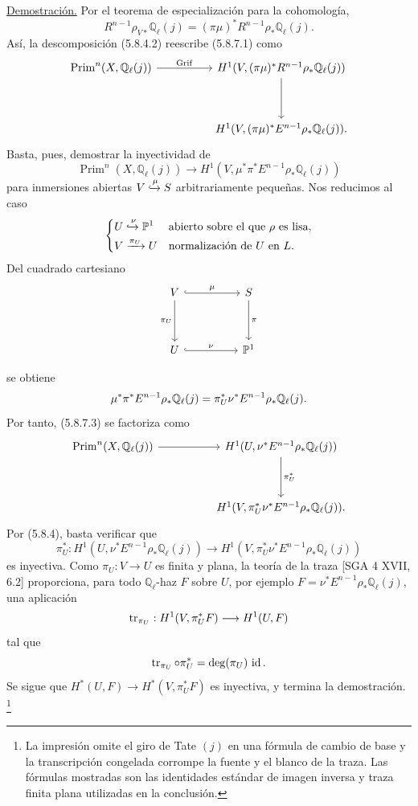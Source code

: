 \noindent\underline{Demostración.}
Por el teorema de especialización para la cohomología,
\[
R^{n-1}\rho_{V*}\mathbb Q_\ell(j)
=(\pi\mu)^*R^{n-1}\rho_*\mathbb Q_\ell(j).
\]
Así, la descomposición (5.8.4.2) reescribe (5.8.7.1) como
\[
\begin{tikzcd}[column sep=huge,row sep=huge]
\operatorname{Prim}^n(X,\mathbb Q_\ell(j))
  \arrow[r,"\operatorname{Grif}"]
& H^1(V,(\pi\mu)^*R^{n-1}\rho_*\mathbb Q_\ell(j)) \arrow[d] \\
{}
& H^1(V,(\pi\mu)^*E^{n-1}\rho_*\mathbb Q_\ell(j)).
\end{tikzcd}
\]
Basta, pues, demostrar la inyectividad de
\begin{equation}\tag{5.8.7.3}
\operatorname{Prim}^n(X,\mathbb Q_\ell(j))
\longrightarrow
H^1(V,\mu^*\pi^*E^{n-1}\rho_*\mathbb Q_\ell(j))
\end{equation}
para inmersiones abiertas $V\xhookrightarrow{\mu}S$ arbitrariamente
pequeñas. Nos reducimos al caso
\[
\left\{
\begin{aligned}
U&\xhookrightarrow{\nu}\mathbb P^1
   &&\text{abierto sobre el que $\rho$ es lisa},\\
V&\xrightarrow{\pi_U}U
   &&\text{normalización de $U$ en $L$}.
\end{aligned}
\right.
\]
Del cuadrado cartesiano
\[
\begin{tikzcd}[column sep=huge,row sep=huge]
V\arrow[r,hook,"\mu"]\arrow[d,"\pi_U"']
&S\arrow[d,"\pi"]\\
U\arrow[r,hook,"\nu"]
&\mathbb P^1
\end{tikzcd}
\]

\pageoriginale

se obtiene
\[
\mu^*\pi^*E^{n-1}\rho_*\mathbb Q_\ell(j)
=\pi_U^*\nu^*E^{n-1}\rho_*\mathbb Q_\ell\sisi{}{(j)}.
\]
Por tanto, (5.8.7.3) se factoriza como
\[
\begin{tikzcd}[column sep=huge,row sep=huge]
\operatorname{Prim}^n(X,\mathbb Q_\ell(j)) \arrow[r]
&H^1(U,\nu^*E^{n-1}\rho_*\mathbb Q_\ell(j))
  \arrow[d,"\pi_U^*"] \\
{}
&H^1(V,\pi_U^*\nu^*E^{n-1}\rho_*\mathbb Q_\ell(j)).
\end{tikzcd}
\]
Por (5.8.4), basta verificar que
\[
\pi_U^*:H^1(U,\nu^*E^{n-1}\rho_*\mathbb Q_\ell(j))
\longrightarrow
H^1(V,\pi_U^*\nu^*E^{n-1}\rho_*\mathbb Q_\ell(j))
\]
es inyectiva. Como $\pi_U:V\to U$ es finita y plana, la teoría de la
traza [SGA 4 XVII, 6.2] proporciona, para todo $\mathbb Q_\ell$-haz
$F$ sobre $U$, por ejemplo
$F=\nu^*E^{n-1}\rho_*\mathbb Q_\ell(j)$, una aplicación
\[
\operatorname{tr}_{\pi_U}:H^1(V,\pi_U^*\sisi{}{F})
\longrightarrow H^1(U,F\sisi{(j)}{})
\]
tal que
\[
\sisi{\operatorname{tr}_{\pi}\circ\pi^*}
{\operatorname{tr}_{\pi_U}\circ\pi_U^*}
=\deg(\pi_U)\,\operatorname{id}.
\]
Se sigue que $H^*(U,F)\to H^*(V,\pi_U^*F)$ es inyectiva, y termina la
demostración.
\footnote{La impresión omite el giro de Tate $(j)$ en una fórmula de cambio
de base y la transcripción congelada corrompe la fuente y el blanco de
la traza. Las fórmulas mostradas son las identidades estándar de
imagen inversa y traza finita plana utilizadas en la conclusión.}

